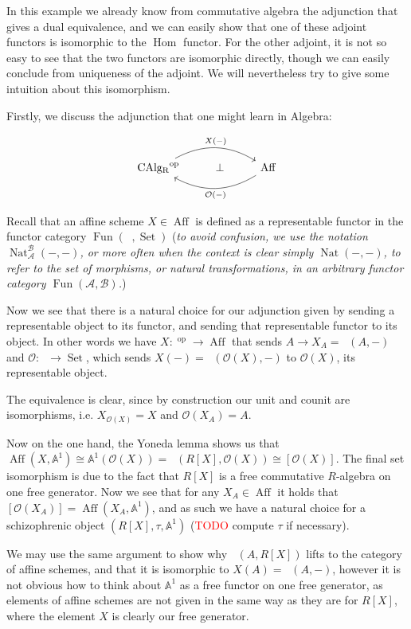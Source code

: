 \documentclass[12pt,a4paper]{article}
\DeclareMathOperator{\Hom}{Hom}
\DeclareMathOperator{\Set}{Set}
\DeclareMathOperator{\CAlg}{CAlg_R}
\DeclareMathOperator{\Aff}{Aff}
\DeclareMathOperator{\Fun}{Fun}
\DeclareMathOperator{\Nat}{Nat}
\DeclareMathOperator{\op}{op}
\begin{document}
In this example we already know from commutative algebra the adjunction that gives a dual equivalence, and we can easily show that one of these adjoint functors is isomorphic to the $\Hom$ functor. For the other adjoint, it is not so easy to see that the two functors are isomorphic directly, though we can easily conclude from uniqueness of the adjoint.  We will nevertheless try to give some intuition about this isomorphism.

Firstly, we discuss the adjunction that one might learn in Algebra:

\[\begin{tikzcd}
	{\CAlg^{\op}} & \bot & {\Aff}
	\arrow["X(-)" , bend left, from=1-1, to=1-3]
	\arrow["\mathcal{O}(-)", bend left, from=1-3, to=1-1]
\end{tikzcd}\]

Recall that an affine scheme $X \in \Aff$ is defined as a representable functor in the functor category $\Fun(\CAlg, \Set)$ (\emph{to avoid confusion, we use the notation $\Nat_{\mathcal{A}}^{\mathcal{B}}(-,-)$, or more often when the context is clear simply $\Nat(-,-)$, to refer to the set of morphisms, or natural transformations, in an arbitrary functor category $\Fun(\mathcal{A},\mathcal{B})$.})

Now we see that there is a natural choice for our adjunction given by sending a representable object to its functor, and sending that representable functor to its object. In other words we have $X: \CAlg^{\op} \to \Aff$ that sends $A \to X_A = \CAlg(A, -)$ and $\mathcal{O}: \CAlg \to \Set$, which sends $X(-) = \CAlg(\mathcal{O}(X), -)$ to $\mathcal{O}(X)$, its representable object.

The equivalence is clear, since by construction  our unit and counit are  isomorphisms, i.e. $X_{\mathcal{O}(X)} =X$ and $\mathcal{O}(X_A) = A$. 


Now on the one hand,  the Yoneda lemma shows us that   $\Aff(X, \mathbb{A}^1) \cong \mathbb{A}^1(\mathcal{O}(X)) = \CAlg(R[X], \mathcal{O}(X)) \cong [\mathcal{O}(X)]$. The final set isomorphism is due to the fact that $R[X]$ is a free commutative $R$-algebra on one free generator. Now we see that for any $X_A \in \Aff$ it holds that $[\mathcal{O}(X_A)] = \Aff(X_A, \mathbb{A}^1)$, and as such we have a natural choice for a schizophrenic object $(R[X], \tau, \mathbb{A}^1 )$ (\textcolor{red}{TODO} compute $\tau$ if necessary). 


We may use the same argument to show why $\CAlg(A, R[X])$ lifts to the category of affine schemes, and that it is isomorphic to $X(A) = \CAlg(A, -)$, however it is not obvious how to think about $\mathbb{A}^1$ as a free functor on one free generator, as elements of affine schemes are not given in the same way as they are for $R[X]$, where the element $X$ is clearly our free generator. 
\end{document}
